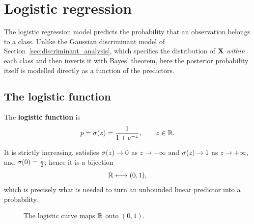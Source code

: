 \section{Logistic regression}
\label{sec:logistic_regression}

The logistic regression model predicts the probability that an observation
belongs to a class. Unlike the Gaussian discriminant model of
Section~\ref{sec:discriminant_analysis}, which specifies the distribution of
$\mathbf{X}$ \emph{within} each class and then inverts it with Bayes' theorem, here
the posterior probability itself is modelled directly as a function of the
predictors.

\subsection{The logistic function}
\label{subsec:logistic_function}

\begin{definition}
  \label{def:logistic_function}
  The \textbf{logistic function} is
  \begin{equation}
    \label{eq:logistic}
    p=\sigma(z)=\frac{1}{1+e^{-z}},
    \qquad z\in\mathbb{R} .
  \end{equation}
\end{definition}

It is strictly increasing, satisfies $\sigma(z)\to 0$ as $z\to-\infty$ and
$\sigma(z)\to 1$ as $z\to+\infty$, and $\sigma(0)=\tfrac12$; hence it is a bijection
\begin{equation}
  \label{eq:logistic_bijection}
  \mathbb{R}\longleftrightarrow(0,1),
\end{equation}
which is precisely what is needed to turn an unbounded linear predictor into a
probability.

\begin{figure}[H]
  \centering
  \caption{The logistic curve maps $\mathbb{R}$ onto $(0,1)$.}
  \label{fig:logistic_curve}
\end{figure}

